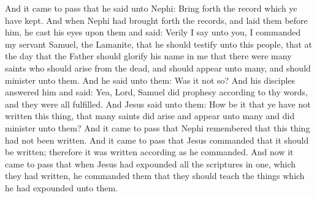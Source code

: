 \bverse \iffalse And it came to pass that he said unto Nephi: Bring forth the record which ye have kept. \fi
And it came to pass that he said unto Nephi: Bring forth the record which ye have kept.
\bverse \iffalse And when Nephi had brought forth the records, and laid them before him, he cast his eyes upon them and said: \fi
And when Nephi had brought forth the records, and laid them before him, he cast his eyes upon them and said:
\bverse \iffalse Verily I say unto you, I commanded my servant Samuel, the Lamanite, that he should testify unto this people, that at the day that the Father should glorify his name in me that there were many saints who should arise from the dead, and should appear unto many, and should minister unto them. And he said unto them: Was it not so? \fi
Verily I say unto you, I commanded my servant Samuel, the Lamanite, that he should testify unto this people, that at the day that the Father should glorify his name in me that there were many saints who should arise from the dead, and should appear unto many, and should minister unto them. And he said unto them: Was it not so?
\bverse \iffalse And his disciples answered him and said: Yea, Lord, Samuel did prophesy according to thy words, and they were all fulfilled. \fi
And his disciples answered him and said: Yea, Lord, Samuel did prophesy according to thy words, and they were all fulfilled.
\bverse \iffalse And Jesus said unto them: How be it that ye have not written this thing, that many saints did arise and appear unto many and did minister unto them? \fi
And Jesus said unto them: How be it that ye have not written this thing, that many saints did arise and appear unto many and did minister unto them?
\bverse \iffalse And it came to pass that Nephi remembered that this thing had not been written. \fi
And it came to pass that Nephi remembered that this thing had not been written.
\bverse \iffalse And it came to pass that Jesus commanded that it should be written; therefore it was written according as he commanded. \fi
And it came to pass that Jesus commanded that it should be written; therefore it was written according as he commanded.
\bverse \iffalse And now it came to pass that when Jesus had expounded all the scriptures in one, which they had written, he commanded them that they should teach the things which he had expounded unto them. \fi
And now it came to pass that when Jesus had expounded all the scriptures in one, which they had written, he commanded them that they should teach the things which he had expounded unto them.
